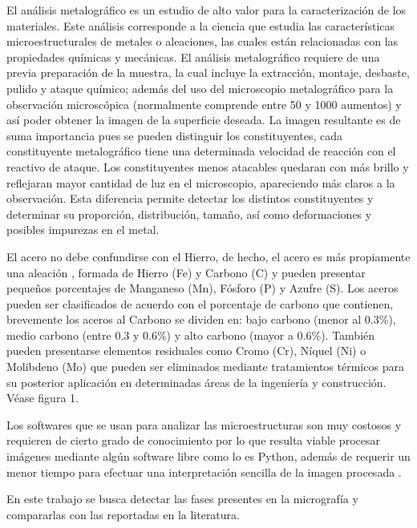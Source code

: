 \documentclass[12pt,twocolumn]{article}
\begin{document}
El an\'alisis metalogr\'afico es un estudio de alto valor para la caracterizaci\'on de los materiales. Este an\'alisis corresponde a la ciencia que estudia las caracter\'isticas microestructurales de metales o aleaciones, las cuales est\'an relacionadas con las propiedades qu\'imicas y mec\'anicas. El an\'alisis metalogr\'afico requiere de una previa preparaci\'on de la muestra, la cual incluye la extracci\'on, montaje, desbaste, pulido y ataque qu\'imico; adem\'as del uso del microscopio metalogr\'afico para la observaci\'on microsc\'opica (normalmente comprende entre 50 y 1000 aumentos) y as\'i poder obtener la imagen de la superficie deseada. La imagen resultante es de suma importancia pues se pueden distinguir los constituyentes, cada constituyente metalogr\'afico tiene una determinada velocidad de reacci\'on con el reactivo de ataque. Los constituyentes menos atacables quedaran con m\'as brillo y reflejaran mayor cantidad de luz en el microscopio, apareciendo m\'as claros a la observaci\'on. Esta diferencia permite detectar los distintos constituyentes y determinar su proporci\'on, distribuci\'on, tama\~no, as\'i como deformaciones y posibles impurezas en el metal. 

El acero no debe confundirse con el Hierro, de hecho, el acero es m\'as propiamente una aleaci\'on \cite{ref1} , formada de Hierro (Fe) y Carbono (C) y pueden presentar peque\~nos porcentajes de Manganeso (Mn), F\'osforo (P) y Azufre (S). Los aceros pueden ser clasificados de acuerdo con el porcentaje de carbono que contienen, brevemente los aceros al Carbono se dividen en: bajo carbono (menor al 0.3\%), medio carbono (entre 0.3 y 0.6\%) y alto carbono (mayor a 0.6\%). Tambi\'en pueden presentarse elementos residuales como Cromo (Cr), N\'iquel (Ni) o Molibdeno (Mo) que pueden ser eliminados mediante tratamientos t\'ermicos para su posterior aplicaci\'on en determinadas \'areas de la ingenier\'ia y construcci\'on. V\'ease figura 1.

Los softwares que se usan para analizar las microestructuras son muy costosos y requieren de cierto grado de conocimiento por lo que resulta viable procesar im\'agenes mediante alg\'un software libre como lo es Python, adem\'as de requerir un menor tiempo para efectuar una interpretaci\'on sencilla de la imagen procesada \cite{ref3} \cite{ref4}.

En este trabajo se busca detectar las fases presentes en la micrograf\'ia y compararlas con las reportadas en la literatura.
\end{document}
